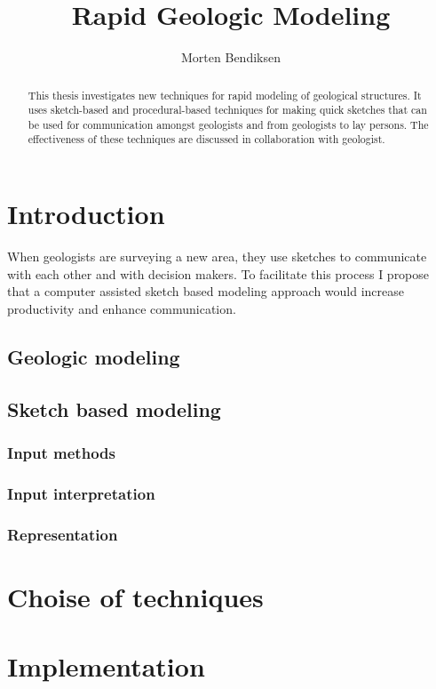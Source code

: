 \documentclass[a4paper,10pt]{article}
\title{Rapid Geologic Modeling}
\author{Morten Bendiksen}
\begin{document}
\maketitle

\begin{abstract}
This thesis investigates new techniques for rapid modeling of geological structures. It uses sketch-based and procedural-based techniques for making quick sketches that can be used for communication amongst geologists and from geologists to lay persons. The effectiveness of these techniques are discussed in collaboration with geologist.
\end{abstract}

\section{Introduction}
When geologists are surveying a new area, they use sketches to communicate with each other and with decision makers. To facilitate this process I propose that a computer assisted sketch based modeling approach would increase productivity and enhance communication.

\subsection{Geologic modeling}

\subsection{Sketch based modeling}
\subsubsection{Input methods}
\subsubsection{Input interpretation}
\subsubsection{Representation}

\section{Choise of techniques}

\section{Implementation}
\end{document}
